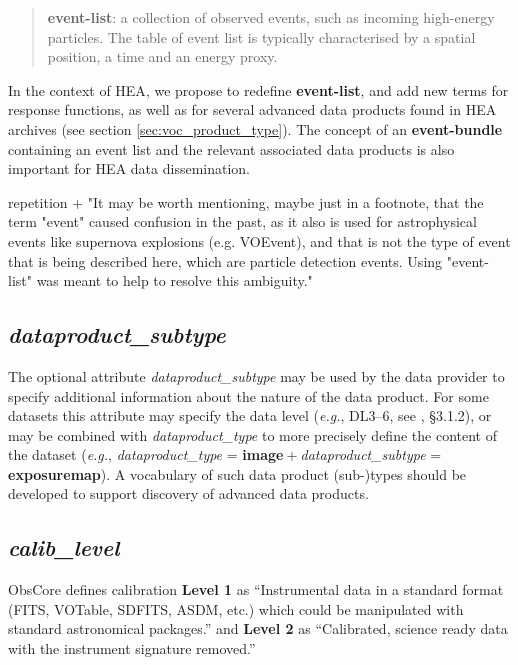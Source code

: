 \documentclass[11pt,a4paper]{ivoa}
\begin{document}
\begin{quote}
{\bf event-list}: a collection of observed events, such as incoming high-energy particles. The table of event list is typically characterised by a spatial position, a time and an energy proxy.
\end{quote}

In the context of \gls{HEA}, we propose to redefine \textbf{event-list}, and add new terms for response functions, as well as for several advanced data products found in \gls{HEA} archives (see section \ref{sec:voc_product_type}). The concept of an \textbf{event-bundle} containing an event list and the relevant associated data products is also important for \gls{HEA} data dissemination.


repetition + "It may be worth mentioning, maybe just in a footnote, that the term "event" caused confusion in the past, as it also is used for astrophysical events like supernova explosions (e.g. VOEvent), and that is not the type of event that is being described here, which are particle detection events. Using "event-list" was meant to help to resolve this ambiguity."

\subsection{{\em dataproduct\_subtype}}

The optional attribute {\em dataproduct\_subtype} may be used by the data provider to specify additional information about the nature of the data product. For some datasets this attribute may specify the data level ({\em e.g.\/}, DL3--6, see \citealt{2024ivoa.note.heig}, \S3.1.2), or may be combined with {\em dataproduct\_type\/} to more precisely define the content of the dataset ({\em e.g.\/}, {\em dataproduct\_type\/} = {\bf image}${}+{}${\em dataproduct\_subtype\/} = {\bf exposuremap}).  A vocabulary of such data product (sub-)types should be developed to support discovery of advanced data products.


\subsection{{\em calib\_level}}

ObsCore defines calibration {\bf Level 1} as ``Instrumental data in a standard format (FITS, VOTable, SDFITS, ASDM, etc.) which could be manipulated with standard astronomical packages.'' and {\bf Level 2} as ``Calibrated, science ready data with the instrument signature removed.''
\end{document}
